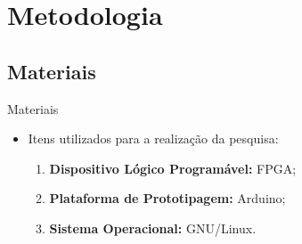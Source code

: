 
\section{Metodologia}
	\subsection{Materiais}
	\begin{frame}{Materiais}
		\begin{itemize}
			\item Itens utilizados para a realização da pesquisa:
			\bigskip
			\begin{enumerate}
  				\setlength\itemsep{1em}
				\item \textbf{Dispositivo Lógico Programável:}  FPGA;
				\item \textbf{Plataforma de Prototipagem:}  Arduino;
				\item \textbf{Sistema Operacional:} GNU/Linux.
			\end{enumerate}
		\end{itemize}
	\end{frame}




